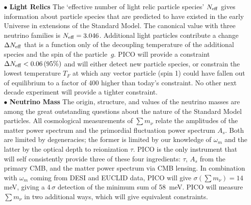 \documentclass[PICOAPC.tex]{subfiles}
\begin{document}
$\bullet$ {\bf Light Relics} \hspace{0.1in} The `effective number of light relic particle species' ${N_{\rm eff}}$ gives information about particle species that are predicted to have existed in the early Universe in extensions of the Standard Model. The canonical value with three neutrino families is ${N_{\rm eff}} = 3.046$. Additional light particles contribute a change $\Delta {N_{\rm eff}}$ that is a function only of the decoupling temperature of the additional species and the spin of the particle~$g$. PICO will provide a constraint $\Delta {N_{\rm eff}} < 0.06 \, (95\%)$ and will either detect new particle species, or constrain the lowest temperature $T_{F}$ at which any vector particle (spin 1) could have fallen out of equilibrium to a factor of 400 higher than today's constraint. No other next decade experiment will provide a tighter constraint.   \\ %
\noindent$\bullet$ {\bf Neutrino Mass} \hspace{0.1in} \label{neutrino_fundamental} The origin, structure, and values of the neutrino masses are among the great outstanding  questions about the nature of the Standard Model particles.  
All cosmological measurements of $\sum m_\nu$ relate the amplitudes of the matter power spectrum and the primordial fluctuation power spectrum $A_s$.  Both are limited by degeneracies; the former is limited by our knowledge of $\omega_m$ and the latter by the optical depth to reionization $\tau$. PICO is the only instrument that will self consistently provide three of these four ingredients: $\tau$, $A_s$ from the primary CMB, and the matter power spectrum via CMB lensing. In combination with $\omega_m$ coming from DESI and EUCLID data, PICO will give $\sigma(\sum m_\nu) = 14$ meV, giving a $4\,\sigma$ detection of the minimum sum of 58~meV.
PICO will measure  $\sum m_\nu$ in two additional ways, which will give equivalent constraints. 

\end{document}

